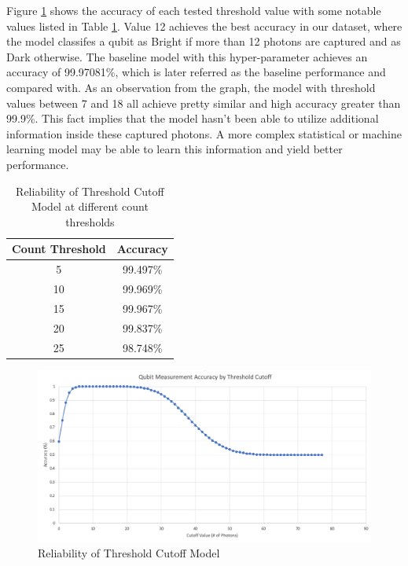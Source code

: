 \documentclass[letterpaper,twocolumn,10pt]{article}
\begin{document}
Figure \ref{fig:threshold_cutoff} shows the accuracy of each tested threshold value with some notable values listed in Table \ref{table:threshold_cutoff}. Value 12 achieves the best accuracy in our dataset, where the model classifes a qubit as Bright if more than 12 photons are captured and as Dark otherwise. The baseline model with this hyper-parameter achieves an accuracy of 99.97081\%, which is later referred as the baseline performance and compared with. As an observation from the graph, the model with threshold values between 7 and 18 all achieve pretty similar and high accuracy greater than 99.9\%. This fact implies that the model hasn't been able to utilize additional information inside these captured photons. A more complex statistical or machine learning model may be able to learn this information and yield better performance. 

\begin{table}
    \caption{Reliability of Threshold Cutoff Model at different count thresholds}
    \begin{center}
        \begin{tabular}{c c}
            Count Threshold & Accuracy \\ [0.5ex] 
            \hline
            5 & 99.497\% \\ 
            10 & 99.969\% \\
            15 & 99.967\% \\
            20 & 99.837\% \\
            25 & 98.748\% \\
       \end{tabular}
    \end{center}
    \label{table:threshold_cutoff}  
\end{table}


\begin{figure}
    \includegraphics[width=\linewidth]{Figures/threshold_cutoff_accuracy.png}
    \centering
    \caption{Reliability of Threshold Cutoff Model}
    \label{fig:threshold_cutoff}
\end{figure}
\end{document}
